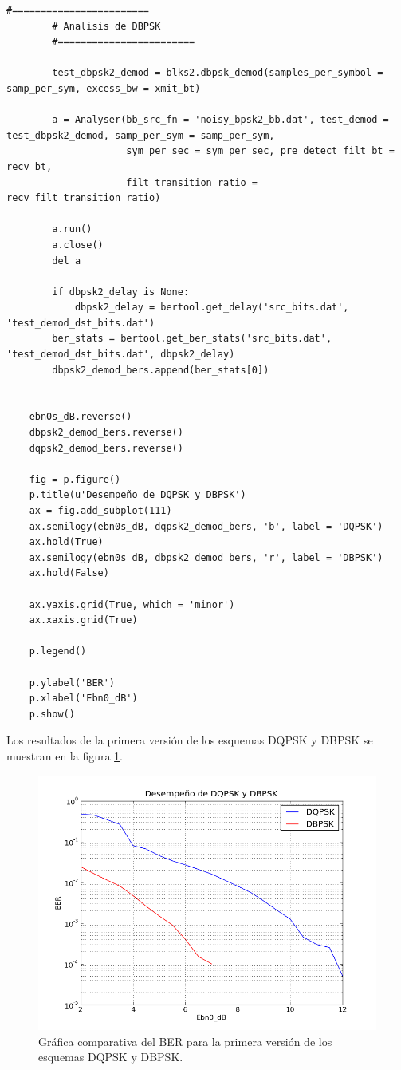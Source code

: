 \begin{lstlisting}[float=hp, label=ex:mainber, caption={C\'odigo Python de la rutina principal del
analisis del BER.}, breaklines=true]
        #========================
        # Analisis de DBPSK
        #========================

        test_dbpsk2_demod = blks2.dbpsk_demod(samples_per_symbol = samp_per_sym, excess_bw = xmit_bt)

        a = Analyser(bb_src_fn = 'noisy_bpsk2_bb.dat', test_demod = test_dbpsk2_demod, samp_per_sym = samp_per_sym,
                     sym_per_sec = sym_per_sec, pre_detect_filt_bt = recv_bt,
                     filt_transition_ratio = recv_filt_transition_ratio)

        a.run()
        a.close()
        del a

        if dbpsk2_delay is None:
            dbpsk2_delay = bertool.get_delay('src_bits.dat', 'test_demod_dst_bits.dat')
        ber_stats = bertool.get_ber_stats('src_bits.dat', 'test_demod_dst_bits.dat', dbpsk2_delay)
        dbpsk2_demod_bers.append(ber_stats[0])


    ebn0s_dB.reverse()
    dbpsk2_demod_bers.reverse()
    dqpsk2_demod_bers.reverse()

    fig = p.figure()
    p.title(u'Desempeño de DQPSK y DBPSK')
    ax = fig.add_subplot(111)
    ax.semilogy(ebn0s_dB, dqpsk2_demod_bers, 'b', label = 'DQPSK')
    ax.hold(True)
    ax.semilogy(ebn0s_dB, dbpsk2_demod_bers, 'r', label = 'DBPSK')
    ax.hold(False)

    ax.yaxis.grid(True, which = 'minor')
    ax.xaxis.grid(True)

    p.legend()

    p.ylabel('BER')
    p.xlabel('Ebn0_dB')
    p.show()
\end{lstlisting}

Los resultados de la primera versi\'on de los esquemas DQPSK y DBPSK se muestran en la figura
\ref{fig:bernormal}.

\begin{figure}[htp]
  \centering
  \includegraphics[scale=0.7]{figs/bernormal}
  \caption{Gr\'afica comparativa del BER para la primera versi\'on de los esquemas DQPSK y DBPSK.}
  \label{fig:bernormal}
\end{figure}

